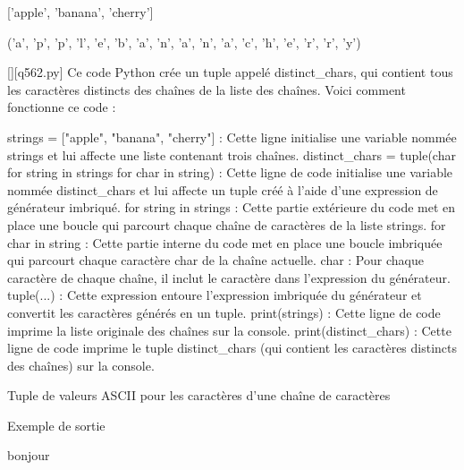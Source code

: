 ['apple', 'banana', 'cherry']

('a', 'p', 'p', 'l', 'e', 'b', 'a', 'n', 'a', 'n', 'a', 'c', 'h', 'e', 'r', 'r', 'y')
        \par
        \begin{solution}
            \renewcommand{\nomfichier}{q562.py}
            \pythonfile{\chemincode \nomfichier}[][\nomfichier]
            Ce code Python crée un tuple appelé distinct\_chars, qui contient tous les caractères distincts des chaînes de la liste des chaînes. Voici comment fonctionne ce code :

    strings = ["apple", "banana", "cherry"] : Cette ligne initialise une variable nommée strings et lui affecte une liste contenant trois chaînes.
    distinct\_chars = tuple(char for string in strings for char in string) : Cette ligne de code initialise une variable nommée distinct\_chars et lui affecte un tuple créé à l'aide d'une expression de générateur imbriqué.
        for string in strings : Cette partie extérieure du code met en place une boucle qui parcourt chaque chaîne de caractères de la liste strings.
        for char in string : Cette partie interne du code met en place une boucle imbriquée qui parcourt chaque caractère char de la chaîne actuelle.
        char : Pour chaque caractère de chaque chaîne, il inclut le caractère dans l'expression du générateur.
        tuple(...) : Cette expression entoure l'expression imbriquée du générateur et convertit les caractères générés en un tuple.
    print(strings) : Cette ligne de code imprime la liste originale des chaînes sur la console.
    print(distinct\_chars) : Cette ligne de code imprime le tuple distinct\_chars (qui contient les caractères distincts des chaînes) sur la console.
        \end{solution}
        

        \question
        Tuple de valeurs ASCII pour les caractères d'une chaîne de caractères

Exemple de sortie

bonjour

